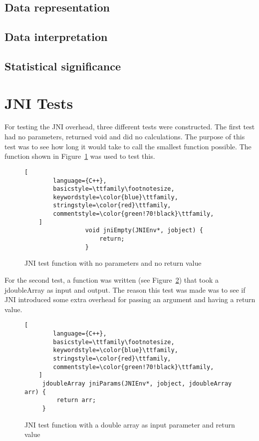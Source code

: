 \subsection{Data representation}
\subsection{Data interpretation}
\subsection{Statistical significance}


\section{JNI Tests}
For testing the JNI overhead, three different tests were constructed. The first test had no parameters, returned void and did no calculations. The purpose of this test was to see how long it would take to call the smallest function possible. The function shown in Figure~\ref{fig:jni:empty} was used to test this.

\begin{figure}
\begin{lstlisting}[
        language={C++},
        basicstyle=\ttfamily\footnotesize,
        keywordstyle=\color{blue}\ttfamily,
        stringstyle=\color{red}\ttfamily,
        commentstyle=\color{green!70!black}\ttfamily,
    ]
                 void jniEmpty(JNIEnv*, jobject) {
                     return;
                 }
\end{lstlisting}
\caption{JNI test function with no parameters and no return value}
\label{fig:jni:empty}
\end{figure}

For the second test, a function was written (see Figure~\ref{fig:jni:params}) that took a jdoubleArray as input and output. The reason this test was made was to see if JNI introduced some extra overhead for passing an argument and having a return value.

\begin{figure}
\begin{lstlisting}[
        language={C++},
        basicstyle=\ttfamily\footnotesize,
        keywordstyle=\color{blue}\ttfamily,
        stringstyle=\color{red}\ttfamily,
        commentstyle=\color{green!70!black}\ttfamily,
    ]
     jdoubleArray jniParams(JNIEnv*, jobject, jdoubleArray arr) {
         return arr;
     }
\end{lstlisting}
\caption{JNI test function with a double array as input parameter and return value}
\label{fig:jni:params}
\end{figure}

